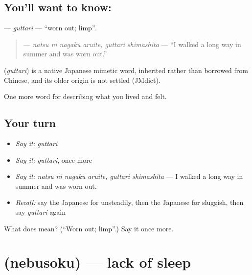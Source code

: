 \subsection*{You'll want to know: }
\textbf{} — \emph{guttari} — \textquotedblleft{}worn out; limp\textquotedblright{}.

\begin{quote}
\textbf{  } — \emph{natsu ni nagaku aruite, guttari shimashita} — \textquotedblleft{}I walked a long way in summer and was worn out.\textquotedblright{}
\end{quote}

\begin{cousinweb}
\textbf{} (\emph{guttari}) is a native Japanese mimetic word, inherited rather than borrowed from Chinese, and its older origin is not settled (JMdict).
\end{cousinweb}

\begin{grammarlens}[title={What you've built}]
One more word for describing what you lived and felt.
\end{grammarlens}

\subsection*{Your turn}
\begin{itemize}
\raggedright
  \item \emph{Say it:} \emph{guttari}
  \item \emph{Say it:} \emph{guttari}, once more
  \item \emph{Say it:} \emph{natsu ni nagaku aruite, guttari shimashita} — I walked a long way in summer and was worn out.
  \item \emph{Recall:} say the Japanese for unsteadily, then the Japanese for sluggish, then say \emph{guttari} again
\end{itemize}

\begin{tcolorbox}[breakable,colback=teal!4,colframe=teal!35!black,title={Before you move on}]
What does  mean? (\textquotedblleft{}Worn out; limp\textquotedblright{}.) Say it once more.
\end{tcolorbox}
\section[\texorpdfstring{\ja{ねぶそく} (nebusoku)}{ねぶそく (nebusoku)}]{ (nebusoku) — lack of sleep}

